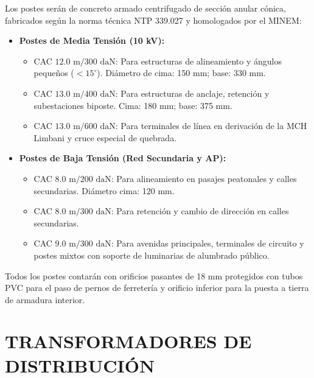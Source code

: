 Los postes serán de concreto armado centrifugado de sección anular cónica, fabricados según la norma técnica NTP 339.027 y homologados por el MINEM:
\begin{itemize}
  \item \textbf{Postes de Media Tensión (10 kV):}
    \begin{itemize}
      \item CAC $12.0\text{ m} / 300\text{ daN}$: Para estructuras de alineamiento y ángulos pequeños ($< 15^\circ$). Diámetro de cima: 150 mm; base: 330 mm.
      \item CAC $13.0\text{ m} / 400\text{ daN}$: Para estructuras de anclaje, retención y subestaciones biposte. Cima: 180 mm; base: 375 mm.
      \item CAC $13.0\text{ m} / 600\text{ daN}$: Para terminales de línea en derivación de la MCH Limbani y cruce especial de quebrada.
    \end{itemize}
  \item \textbf{Postes de Baja Tensión (Red Secundaria y AP):}
    \begin{itemize}
      \item CAC $8.0\text{ m} / 200\text{ daN}$: Para alineamiento en pasajes peatonales y calles secundarias. Diámetro cima: 120 mm.
      \item CAC $8.0\text{ m} / 300\text{ daN}$: Para retención y cambio de dirección en calles secundarias.
      \item CAC $9.0\text{ m} / 300\text{ daN}$: Para avenidas principales, terminales de circuito y postes mixtos con soporte de luminarias de alumbrado público.
    \end{itemize}
\end{itemize}
Todos los postes contarán con orificios pasantes de 18 mm protegidos con tubos PVC para el paso de pernos de ferretería y orificio inferior para la puesta a tierra de armadura interior.

\section{TRANSFORMADORES DE DISTRIBUCIÓN}

